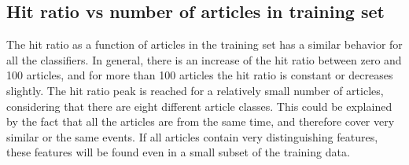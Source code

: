 \subsection{Hit ratio vs number of articles in training set}
The hit ratio as a function of articles in the training set has a similar behavior for all the classifiers. In  general, there is an increase of the hit ratio between zero and 100 articles, and for more than 100 articles the hit ratio is constant or decreases slightly. The hit ratio peak is reached for a relatively small number of articles, considering that there are eight different article classes. This could be explained by the fact that all the articles are from the same time, and therefore cover very similar or the same events. If all articles contain very distinguishing features, these features will be found even in a small subset of the training data.
